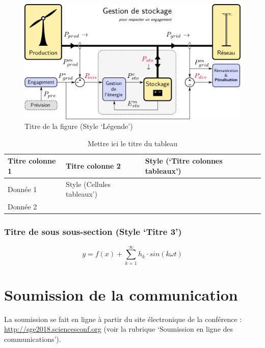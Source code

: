 \documentclass[a4paper,10pt,twocolumn]{article}
\begin{document}
\begin{figure}[!ht]
	\begin{center}
		\includegraphics[width=0.6\columnwidth]{figures/wind_storage.pdf}
	\end{center}
	
	\caption{Titre de la figure (Style ‘Légende’)}
	\label{fig_1}
\end{figure}

\begin{table}[!h]
	\caption{Mettre ici le titre du tableau}
	
	\begin{center}
		\begin{tabular}{|>{\footnotesize}L{1.4cm}|>{\footnotesize}L{1.5cm}|>{\footnotesize}L{2.4cm}|>{\footnotesize}L{2.1cm}|}
			\hline
			\textbf{Titre colonne 1} & \textbf{Titre colonne 2} & \textbf{Style (‘Titre colonnes tableaux’)} & \textbf{} \\
			\hline
			Donnée 1 & Style (Cellules tableaux’) & & \\
			\hline
			Donnée 2 & & & \\
			\hline
		\end{tabular}
	\end{center}
	
	\label{tab_1}
\end{table}

\subsubsection{Titre de sous sous-section (Style ‘Titre 3’)}

\begin{equation}
	y = f(x) + \sum_{k=1}^{\infty} h_k \cdot sin(k \omega t)
	\label{eq_1}
\end{equation}


\section{Soumission de la communication}

La soumission se fait en ligne à partir du site électronique de la conférence : \url{http://sge2018.sciencesconf.org} (voir la rubrique ‘Soumission en ligne des communications’).\\
\end{document}
